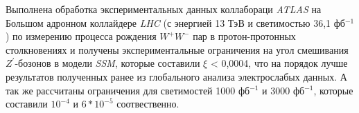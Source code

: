 Выполнена обработка экспериментальных данных коллабораци  \textit{ATLAS} на Большом адронном коллайдере \textit{LHC} (с энергией 13 ТэВ и светимостью 36,1 фб${}^{−1}$) по измерению процесса рождения ${W}^{+}$${W}^{-}$ пар в протон-протонных столкновениях и получены экспериментальные ограничения на угол смешивания ${Z}^{\prime}$-бозонов в модели \textit{SSM}, которые составили $\xi$ < 0,0004, что на порядок лучше результатов полученных ранее из глобального анализа электрослабых данных. А так же рассчитаны ограничения для светимостей 1000 фб${}^{−1}$ и 3000 фб${}^{−1}$, которые составили ${10}^{-4}$ и $6*{10}^{-5}$ соотвественно.